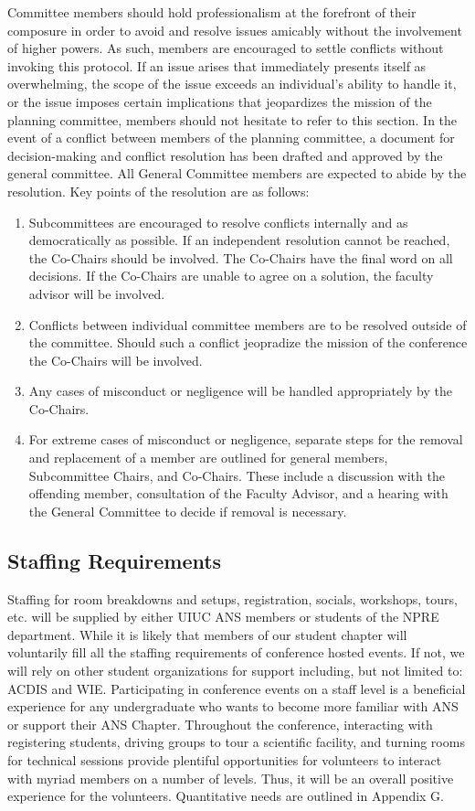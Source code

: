 Committee members should hold professionalism at the forefront of their composure in order to avoid and resolve issues amicably without the involvement of higher powers. As such, members are encouraged to settle conflicts without invoking this protocol. If an issue arises that immediately presents itself as overwhelming, the scope of the issue exceeds an individual’s ability to handle it, or the issue imposes certain implications that jeopardizes the mission of the planning committee, members should not hesitate to refer to this section. In the event of a conflict between members of the planning committee, a document for decision-making and
conflict resolution has been drafted and approved by the general committee. All General Committee members
are expected to abide by the resolution. Key points of the resolution are as follows:
\begin{enumerate}
	\item Subcommittees are encouraged to resolve conflicts internally and as democratically as possible. If an independent resolution cannot be reached, the Co-Chairs should be involved. The Co-Chairs have the final word on all decisions. If the Co-Chairs are unable to agree on a solution, the faculty advisor will be involved.
	\item Conflicts between individual committee members are to be resolved outside of the committee. Should such a conflict jeopradize the mission of the conference the Co-Chairs will be involved. 
	\item Any cases of misconduct or negligence will be handled appropriately by the Co-Chairs.
	\item For extreme cases of misconduct or negligence, separate steps for the removal and replacement of a
	member are outlined for general members, Subcommittee Chairs, and Co-Chairs. These include
	a discussion with the offending member, consultation of the Faculty Advisor, and a hearing with the
	General Committee to decide if removal is necessary.
\end{enumerate}

\subsection{Staffing Requirements}
Staffing for room breakdowns and setups, registration, socials, workshops, tours, etc.  will be supplied by either UIUC ANS members or students of the NPRE department. While it is likely that members of our student chapter will voluntarily fill all the staffing requirements of conference hosted events. If not, we will rely on other student organizations for support including, but not limited to: ACDIS and WIE. Participating in conference events on a staff level is a beneficial experience for any undergraduate who wants to become more familiar with ANS or support their ANS Chapter. Throughout the conference, interacting with registering students, driving groups to tour a scientific facility, and turning rooms for technical sessions provide plentiful opportunities for volunteers to interact with myriad members on a number of levels. Thus, it will be an overall positive experience for the volunteers. Quantitative needs are outlined in Appendix G.

